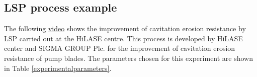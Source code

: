 \subsection{LSP process example}

The following \href{https://www.youtube.com/watch?v=awhlLU91-dk&ab_channel=HiLASECentre}{video} shows the improvement of cavitation erosion resistance by LSP carried out at the HiLASE centre. This process is developed by HiLASE center and SIGMA GROUP Plc. for the improvement of cavitation erosion resistance of pump blades. The parameters chosen for this experiment are shown in Table \ref{experimentalparameters}. 

